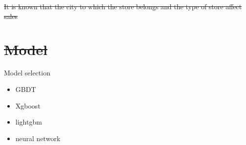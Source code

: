 \documentclass[
 size=14pt,
 paper=smartboard,  %
 mode=present, 		%
 display=slides, 	%
 style=tuliplab,  	%
 pauseslide,
 fleqn,leqno]{powerdot}
\providecommand{\DIFdeltex}[1]{{\protect\color{red}\sout{#1}}}                      %
\providecommand{\DIFdelend}{} %
\providecommand{\DIFdel}[1]{\texorpdfstring{\DIFdeltex{#1}}{}} %
\DeclareRobustCommand{\DIFdelend}{\DIFOaddend \let\includegraphics\DIFOincludegraphics} %
\begin{document}


\DIFdel{It is known that the city to which the store belongs and the type of store affect sales
  }%

\section{\DIFdel{Model}}
\addtocounter{section}{-1}%

\DIFdelend \begin{slide}[toc=,bm=]{Model selection}
  \begin{itemize}
    \item GBDT
    \item Xgboost
    \item lightgbm
    \item neural network
  \end{itemize}
\end{slide}
\end{document}
